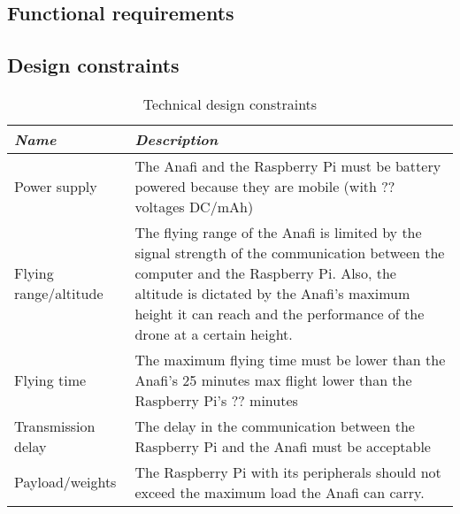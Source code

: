 \documentclass[../main.tex]{subfiles}
\begin{document}
\subsection{Functional requirements}

\blindtext
\newpage
\subsection{Design constraints}

\begin{table}[hbt!]
	\begin{tabular}{ | P{2.8cm} | P{12.2cm} |}
		\hline
		\textit{Name} & \textit{Description}\\ \hline
		Power supply  & The Anafi and the Raspberry Pi must be battery powered because they are mobile (with ?? voltages DC/mAh)  \\ \hline
		
		Flying range/altitude & The flying range of the Anafi is limited by the signal strength of the communication between the computer and the Raspberry Pi. Also, the altitude is dictated by the Anafi’s maximum height it can reach and the performance of the drone at a certain height. \\ \hline
		
		Flying time  & The maximum flying time must be lower than the Anafi’s 25 minutes max flight lower than the Raspberry Pi’s ?? minutes \\ \hline
		
		Transmission delay  & The delay in the communication between the Raspberry Pi and the Anafi must be acceptable \\ \hline
		
		Payload/weights  & The Raspberry Pi with its peripherals should not exceed the maximum load the Anafi can carry. \\ \hline
		
	\end{tabular}
	\caption{Technical design constraints}
\end{table} \label{tab: technical-design-constraints}
\end{document}
